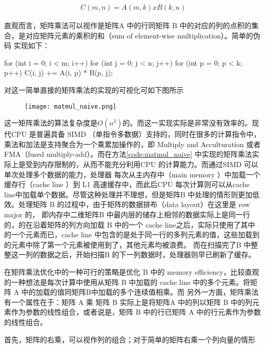 \begin{align}
  C(m, n) = A(m, k) x B(k, n)
\end{align}

直观而言，矩阵乘法可以视作是矩阵A 中的行同矩阵 B 中的对应的列的点积的集合，是对应矩阵元素的乘积的和（sum of element-wise multiplication）。简单的伪码
实现如下：

\begin{listing}
\label{code:matmul_naive}
  for (int i = 0; i < m; i++) {
    for (int j = 0; j < n; j++) {
      for (int p = 0; p < k; p++) {
        C(i, j) += A(i, p) * B(p, j);
      }
    }
  }
\end{listing}

对这一简单直接的矩阵乘法的实现的可视化可如下图所示

\begin{figure}
\texttt{[image: matmul\_naive.png]}
\end{figure}

这一矩阵乘法的算法复杂度是$O(n^3)$的。而这一实现实际是非常没有效率的。现代CPU 是普遍具备 SIMD （单指令多数据）支持的，同时在很多的计算指令中，乘法和加法是支持聚合为一个乘累加操作的，即 Multiply and 
Acculturation 或者 FMA（fused multiply-add）。而在方法\ref{code:matmul_naive} 中实现的矩阵乘法实际上是受到内存限制的，从而不能充分利用CPU 的计算能力。而通过SIMD 可以单次处理多个数据的能力，处理器
每次从主内存中（main memory ）中加载一个缓存行（cache line ）到 L1 高速缓存中，而此后CPU 每次计算则可以从cache line中加载单个数据。尽管这种处理并不理想，但是矩阵B 中处理的情形则更加低效。处理矩阵 B
的过程中，由于矩阵的数据排布（data layout）在这里是 row major 的， 即内存中二维矩阵B 中最内层的储存上相邻的数据实际上是同一行的，的在沿着矩阵的列方向加载 B 中的一个 cache line之后，实际只使用了其中
的一个元素而已，cache line 中包含的是处于同一行的多列元素的值，这些加载到的元素中除了第一个元素被使用到了，其他元素均被浪费。
而在扫描完了B 中整整这一列的数据之后，开始扫描B 的下一列数据时，处理器则早已刷新了缓存。

在矩阵乘法优化中的一种可行的策略是优化 B 中的 memory efficiency，比较直观的一种想法是每次计算中使用从矩阵 B 中加载的 cache line 中的多个元素。将矩阵 A 中的加载的值同矩阵B中加载的多个连续值相乘。而
另外一方面，矩阵乘法有一个属性在于：矩阵 A 乘 矩阵 B 实际上是将矩阵A 中的列以矩阵 B 中的列元素作为参数的线性组合，或者说是，矩阵 B 中的行已矩阵 A 中的行元素作为参数的线性组合。

首先，矩阵的右乘，可以视作列的组合；对于简单的矩阵右乘一个列向量的情形

